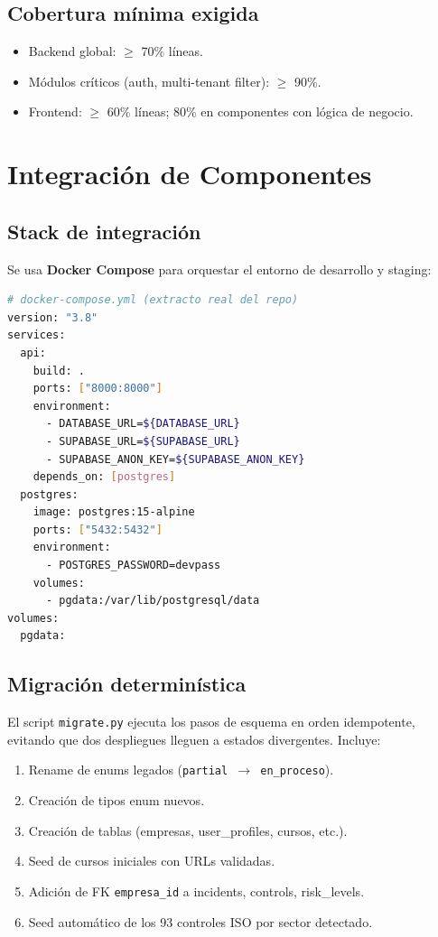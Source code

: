 \documentclass[12pt,a4paper,oneside]{article}
\begin{document}
\subsection{Cobertura mínima exigida}

\begin{itemize}[leftmargin=*]
  \item Backend global: $\geq$ 70\% líneas.
  \item Módulos críticos (auth, multi-tenant filter): $\geq$ 90\%.
  \item Frontend: $\geq$ 60\% líneas; 80\% en componentes con lógica de negocio.
\end{itemize}

\section{Integración de Componentes}

\subsection{Stack de integración}

Se usa \textbf{Docker Compose} para orquestar el entorno de desarrollo y staging:

\begin{lstlisting}[language=bash,morekeywords={services,build,ports,environment,depends_on,volumes}]
# docker-compose.yml (extracto real del repo)
version: "3.8"
services:
  api:
    build: .
    ports: ["8000:8000"]
    environment:
      - DATABASE_URL=${DATABASE_URL}
      - SUPABASE_URL=${SUPABASE_URL}
      - SUPABASE_ANON_KEY=${SUPABASE_ANON_KEY}
    depends_on: [postgres]
  postgres:
    image: postgres:15-alpine
    ports: ["5432:5432"]
    environment:
      - POSTGRES_PASSWORD=devpass
    volumes:
      - pgdata:/var/lib/postgresql/data
volumes:
  pgdata:
\end{lstlisting}

\subsection{Migración determinística}

El script \texttt{migrate.py} ejecuta los pasos de esquema en orden idempotente, evitando que dos despliegues lleguen a estados divergentes. Incluye:

\begin{enumerate}[leftmargin=*]
  \item Rename de enums legados (\texttt{partial $\rightarrow$ en\_proceso}).
  \item Creación de tipos enum nuevos.
  \item Creación de tablas (empresas, user\_profiles, cursos, etc.).
  \item Seed de cursos iniciales con URLs validadas.
  \item Adición de FK \texttt{empresa\_id} a incidents, controls, risk\_levels.
  \item Seed automático de los 93 controles ISO por sector detectado.
\end{enumerate}
\end{document}
